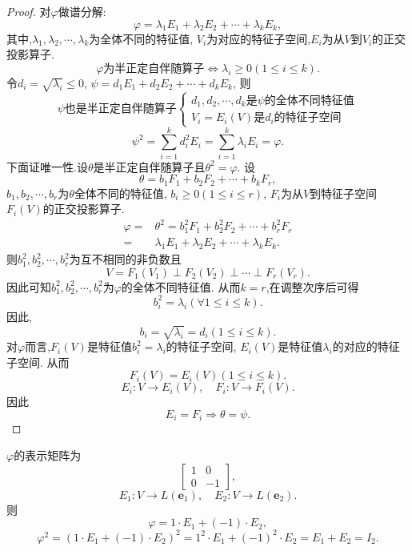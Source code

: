   \begin{proof}
    对$\varphi$做谱分解:
    \[
      \varphi=\lambda_1E_1+\lambda_2E_2+\cdots+\lambda_kE_k,
    \]
    其中,$\lambda_1,\lambda_2,\cdots,\lambda_k$为全体不同的特征值,
    $V_i$为对应的特征子空间,$E_i$为从$V$到$V_i$的正交投影算子.
    \[
    \varphi\text{为半正定自伴随算子} \Longleftrightarrow
    \lambda_i\geq 0(1\leq i \leq k).
    \]
    令$d_i=\sqrt{\lambda_i}\leq 0$, 
    $\psi=d_1E_1+d_2E_2+\cdots+d_kE_k$,
    则
    \[
      \psi\text{也是半正定自伴随算子} \begin{cases}
        d_1,d_2,\cdots,d_k\text{是$\psi$的全体不同特征值}\\
        V_i=E_i(V)\text{是$d_i$的特征子空间}
      \end{cases}
    \]
    \[
      \psi^2=\sum_{i=1}^kd_i^2E_i=\sum_{i=1}^k\lambda_iE_i=\varphi.
    \]
    下面证唯一性.设$\theta$是半正定自伴随算子且$\theta^2=\varphi$.
    设
    \[
      \theta=b_1F_1+b_2F_2+\cdots+b_kF_r,
    \]
    $b_1,b_2,\cdots,b_r$为$\theta$全体不同的特征值,
    $b_i\geq 0(1\leq i \leq r)$, $F_i$为从$V$到特征子空间
    $F_i(V)$的正交投影算子.
    \begin{align*}
      \varphi = & \theta^2=b_1^2F_1+b_2^2F_2+\cdots+b_r^2F_r\\
      =& \lambda_1E_1+\lambda_2E_2+\cdots+\lambda_kE_k.
    \end{align*}
    则$b_1^2,b_2^2,\cdots,b_r^2$为互不相同的非负数且
    \[
      V=F_1(V_1)\perp F_2(V_2)\perp\cdots\perp F_r(V_r).
    \]
    因此可知$b_1^2,b_2^2,\cdots,b_r^2$为$\varphi$的全体不同特征值.
    从而$k=r$,在调整次序后可得
    \[
      b_i^2=\lambda_i(\forall 1\leq i \leq k).
    \]
    因此,
    \[
      b_i=\sqrt{\lambda_i}=d_i (1\leq i \leq k).
    \]
    对$\varphi$而言,$F_i(V)$是特征值$b_i^2=\lambda_i$的特征子空间,
    $E_i(V)$是特征值$\lambda_i$的对应的特征子空间.
    从而
    \[
      F_i(V)=E_i(V)(1\leq i \leq k).
    \]
    \[
      E_i: V\longrightarrow E_i(V), \quad F_i: V\longrightarrow F_i(V).
    \]
    因此
    \[
    E_i=F_i \Longrightarrow \theta = \psi.
    \]
  \end{proof}

  \begin{example}
    $\varphi$的表示矩阵为
    \[
      \begin{bmatrix}
        1 & 0\\
        0 & -1
      \end{bmatrix},
    \]
    \[
      E_1: V\longrightarrow L(\bm{e}_1), 
      \quad E_2: V\longrightarrow L(\bm{e}_2).
    \]
    则
    \[
      \varphi = 1\cdot E_1+(-1)\cdot E_2,
    \]
    \[
      \varphi^2 = (1\cdot E_1+(-1)\cdot E_2)^2= 1^2\cdot E_1+(-1)^2\cdot E_2 
      = E_1+E_2= I_2.
    \]
  \end{example}

